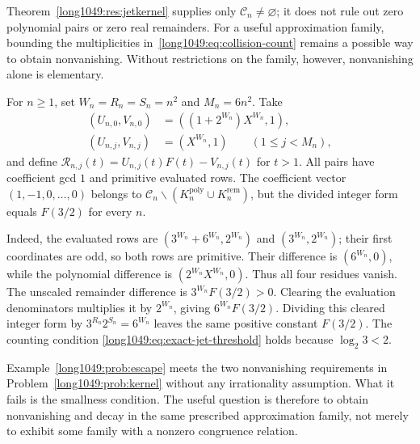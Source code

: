 \documentclass[11pt]{article}
\begin{document}
Theorem~\ref{long1049:res:jetkernel} supplies only
$\mathcal C_n\ne\varnothing$; it does not rule out zero polynomial pairs
or zero real remainders. For a useful approximation family, bounding
the multiplicities in~\eqref{long1049:eq:collision-count} remains a
possible way to obtain nonvanishing. Without restrictions on the
family, however, nonvanishing alone is elementary.

\begin{example}\label{long1049:prob:escape}
For $n\ge1$, set $W_n=R_n=S_n=n^2$ and $M_n=6n^2$. Take
\[
\begin{aligned}
 (U_{n,0},V_{n,0})&=((1+2^{W_n})X^{W_n},1),\\
 (U_{n,j},V_{n,j})&=(X^{W_n},1)\qquad(1\le j<M_n),
\end{aligned}
\]
and define $\mathcal R_{n,j}(t)=U_{n,j}(t)F(t)-V_{n,j}(t)$ for $t>1$.
All pairs have coefficient gcd $1$ and primitive evaluated rows. The
coefficient vector $(1,-1,0,\ldots,0)$ belongs to
$\mathcal C_n\mathbin{\backslash}
(K_n^{\mathrm{poly}}\cup K_n^{\mathrm{rem}})$, but the divided
integer form equals $F(3/2)$ for every $n$.
\end{example}

Indeed, the evaluated rows are
$(3^{W_n}+6^{W_n},2^{W_n})$ and $(3^{W_n},2^{W_n})$; their first
coordinates are odd, so both rows are primitive. Their difference is
$(6^{W_n},0)$, while the polynomial difference is
$(2^{W_n}X^{W_n},0)$. Thus all four residues vanish. The unscaled remainder difference
is $3^{W_n}F(3/2)>0$. Clearing the evaluation denominators multiplies
it by $2^{W_n}$, giving $6^{W_n}F(3/2)$. Dividing this cleared
integer form by $3^{R_n}2^{S_n}=6^{W_n}$ leaves the same positive
constant $F(3/2)$. The counting condition
\eqref{long1049:eq:exact-jet-threshold} holds because $\log_2 3<2$.

Example~\ref{long1049:prob:escape} meets the two nonvanishing
requirements in Problem~\ref{long1049:prob:kernel} without any
irrationality assumption. What it fails is the smallness condition.
The useful question is therefore to obtain nonvanishing and decay in
the same prescribed approximation family, not merely to exhibit some
family with a nonzero congruence relation.
\end{document}
